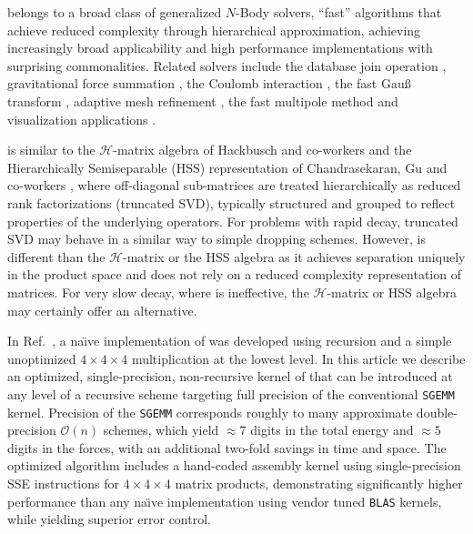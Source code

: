 \SpAMM{} belongs to a broad class of generalized $N$-Body solvers, ``fast''
algorithms that achieve reduced complexity through hierarchical approximation,
achieving increasingly broad applicability and high performance
implementations with surprising commonalities. Related solvers include the
database join operation \cite{Mishra:1992:JPR:128762.128764,
Schneider:1990:TPC:94362.94514, Chen:2007:IHJ:1272743.1272747,
Kim:2009:SVH:1687553.1687564}, gravitational force summation
\cite{10.1109/SUPERC.1992.236647, Warren:1993:PHO:169627.169640,
Warren:1995:HOTb}, the Coulomb interaction \cite{Challacombe:1996:QCTCb,
schwegler:8764}, the fast Gau\ss{} transform \cite{greengard:79, strain:1131,
baxter:257, yang2003:FGT, Wan20067}, adaptive mesh refinement
\cite{Berger1984484, bell:127, Berger198964}, the fast multipole method
\cite{Greengard1987325, Greengard1997, Cheng1999468,
springerlink:10.1007/BFb0089775} and visualization applications
\cite{CGF:CGF1554, CGF:CGF1775, Lefebvre:2006:PSH:1141911.1141926,
Lefebvre:2006:PSH:1179352.1141926, AVRIL:2009:HAL-00412870:1, Zou2008,
694268}.

\SpAMM{} is similar to the $\mathcal{H}$-matrix algebra of Hackbusch and
co-workers \cite{Hackbusch2002, Grasedyck2003} and the Hierarchically
Semiseparable (HSS) representation of Chandrasekaran, Gu and co-workers
\cite{Chandrasekaran2005, Chandrasekaran2006}, where off-diagonal sub-matrices
are treated hierarchically as reduced rank factorizations (truncated SVD),
typically structured and grouped to reflect properties of the underlying
operators. For problems with rapid decay, truncated SVD may behave in a
similar way to simple dropping schemes. However, \SpAMM{} is different than
the $\mathcal{H}$-matrix or the HSS algebra as it achieves separation uniquely
in the product space and does not rely on a reduced complexity representation
of matrices.  For very slow decay, where \SpAMM{} is ineffective, the
$\mathcal{H}$-matrix or HSS algebra may certainly offer an alternative.

In Ref.~\cite{ChallacombeBock2010}, a na\"{\i}ve implementation of \SpAMM{}
was developed using recursion and a simple unoptimized $4 \times 4 \times 4$
multiplication at the lowest level. In this article we describe an optimized,
single-precision, non-recursive kernel of \SpAMM{} that can be introduced at
any level of a recursive scheme targeting full precision of the conventional
{\tt SGEMM} kernel. Precision of the {\tt SGEMM} corresponds roughly to many
approximate double-precision $\mathcal{O} (n)$ schemes, which yield $\approx
7$ digits in the total energy and $\approx 5$ digits in the forces, with an
additional two-fold savings in time and space.  The optimized algorithm
includes a hand-coded assembly kernel using single-precision SSE instructions
for $4 \times 4 \times 4$ matrix products, demonstrating significantly higher
performance than any na\"{\i}ve implementation using vendor tuned {\tt BLAS}
kernels, while yielding superior error control.

